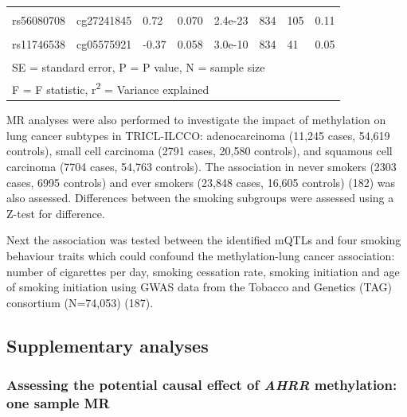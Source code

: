 \documentclass[11pt,oneside]{bristolthesis}
\begin{document}
\begin{table}[!h]
{\begin{tabular}[t]{llllllll}
\cellcolor{gray!6}{rs463924} & \cellcolor{gray!6}{cg26963277} & \cellcolor{gray!6}{-0.39} & \cellcolor{gray!6}{0.045} & \cellcolor{gray!6}{6.8e-18} & \cellcolor{gray!6}{834} & \cellcolor{gray!6}{78} & \cellcolor{gray!6}{0.09}\\
rs56080708 & cg27241845 & 0.72 & 0.070 & 2.4e-23 & 834 & 105 & 0.11\\
\cellcolor{gray!6}{rs11744553} & \cellcolor{gray!6}{cg05575921} & \cellcolor{gray!6}{0.22} & \cellcolor{gray!6}{0.040} & \cellcolor{gray!6}{7.2e-08} & \cellcolor{gray!6}{834} & \cellcolor{gray!6}{30} & \cellcolor{gray!6}{0.03}\\
\addlinespace
rs11746538 & cg05575921 & -0.37 & 0.058 & 3.0e-10 & 834 & 41 & 0.05\\
\bottomrule
\multicolumn{8}{l}{\textsuperscript{} SE = standard error, P = P value, N = sample size}\\
\multicolumn{8}{l}{\textsuperscript{} F = F statistic, r\textsuperscript{2} = Variance explained}\\
\end{tabular}}
\end{table}
\linebreak

MR analyses were also performed to investigate the impact of methylation on lung cancer subtypes in TRICL-ILCCO: adenocarcinoma (11,245 cases, 54,619 controls), small cell carcinoma (2791 cases, 20,580 controls), and squamous cell carcinoma (7704 cases, 54,763 controls). The association in never smokers (2303 cases, 6995 controls) and ever smokers (23,848 cases, 16,605 controls) (182) was also assessed. Differences between the smoking subgroups were assessed using a Z-test for difference.

Next the association was tested between the identified mQTLs and four smoking behaviour traits which could confound the methylation-lung cancer association: number of cigarettes per day, smoking cessation rate, smoking initiation and age of smoking initiation using GWAS data from the Tobacco and Genetics (TAG) consortium (N=74,053) (187).

\hypertarget{methods-supplementary-analyses-07}{%
\subsection{Supplementary analyses}\label{methods-supplementary-analyses-07}}

\hypertarget{ahrr-one-sample-mr-methods}{%
\subsubsection{\texorpdfstring{Assessing the potential causal effect of \emph{AHRR} methylation: one sample MR}{Assessing the potential causal effect of AHRR methylation: one sample MR}}\label{ahrr-one-sample-mr-methods}}
\end{document}
